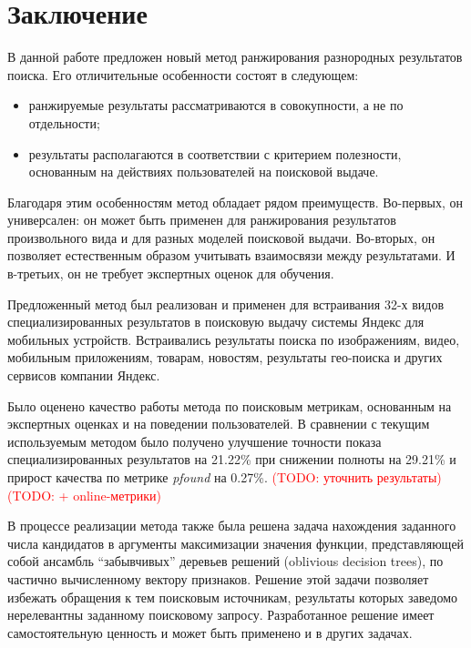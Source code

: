 \documentclass[12pt,a4paper]{report}
\newcommand\note[1]{\textcolor{red}{(#1)}}
\newcommand\todonote[1]{\note{TODO: #1}}
\begin{document}
\chapter*{Заключение}

В данной работе предложен новый метод ранжирования разнородных результатов поиска. Его отличительные особенности состоят в следующем:
\begin{itemize}
  \item ранжируемые результаты рассматриваются в совокупности, а не по отдельности;
  \item результаты располагаются в соответствии с критерием полезности, основанным на действиях пользователей на поисковой выдаче. %
\end{itemize}
Благодаря этим особенностям метод обладает рядом преимуществ. Во-первых, он универсален: он может быть применен для ранжирования результатов произвольного вида и для разных моделей поисковой выдачи. Во-вторых, он позволяет естественным образом учитывать взаимосвязи между результатами. И в-третьих, он не требует экспертных оценок для обучения. 


Предложенный метод был реализован и применен для встраивания 32-х видов специализированных результатов в поисковую выдачу системы Яндекс для мобильных устройств. Встраивались результаты поиска по изображениям, видео, мобильным приложениям, товарам, новостям, результаты гео-поиска и других сервисов компании Яндекс. 

Было оценено качество работы метода по поисковым метрикам, основанным на экспертных оценках и на поведении пользователей. В сравнении с текущим используемым методом было получено улучшение точности показа специализированных результатов на 21.22\% при снижении полноты на 29.21\% и прирост качества по метрике \textit{pfound} на 0.27\%. \todonote{уточнить результаты} \todonote{+ online-метрики}

В процессе реализации метода также была решена задача нахождения заданного числа кандидатов в аргументы максимизации значения функции, представляющей собой ансамбль ``забывчивых'' деревьев решений (oblivious decision trees), по частично вычисленному вектору признаков. Решение этой задачи позволяет избежать обращения к тем поисковым источникам, результаты которых заведомо нерелевантны заданному поисковому запросу. Разработанное решение имеет самостоятельную ценность и может быть применено и в других задачах.
\end{document}
